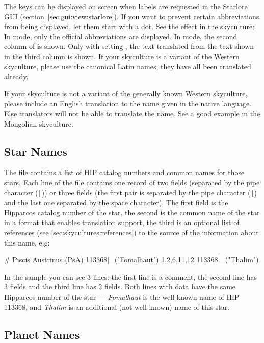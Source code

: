The keys can be displayed on screen when labels are requested in the
Starlore GUI (section~\ref{sec:gui:view:starlore}). If you want to prevent
certain abbreviations from being displayed, let them start with a
dot. See the effect in the  skyculture: In
 mode, only the official abbreviations are
displayed. In  mode, the second column of
 is shown. Only with setting
, the text translated from the text shown in the
third column is shown. If your skyculture is a variant of the Western
skyculture, please use the canonical Latin names, they have all been translated already.

If your skyculture is not a variant of the generally known Western
skyculture, please include an English translation to the name given in
the native language. Else translators will not be able to translate
the name. See a good example in the Mongolian skyculture.

\subsection{Star Names}
\label{sec:skycultures:starnames}

The file  contains a list of HIP catalog
numbers and common names for those stars. Each line of the file
contains one record of two fields (separated by the pipe character
(\texttt{|})) or three fields (the first pair is separated by the 
pipe character (\texttt{|}) and the last one separated by the space 
character). The first field is the Hipparcos catalog number of the
star, the second is the common name of the star in a format that enables
translation support, the third is an optional list of references (see \ref{sec:skycultures:references})  
to the source of the information about this name, e.g:
\begin{configfile}
# Piscis Austrinus (PsA)
113368|_("Fomalhaut") 1,2,6,11,12
113368|_("Thalim")
\end{configfile}

In the sample you can see 3 lines: the first line is a comment, the 
second line has 3 fields and the third line has 2 fields. Both lines 
with data have the same Hipparcos number of the star --- \textit{Fomalhaut} is 
the well-known name of HIP 113368, and \textit{Thalim} is an additional 
(not well-known) name of this star.

\subsection{Planet Names}
\label{sec:skycultures:planetnames}


